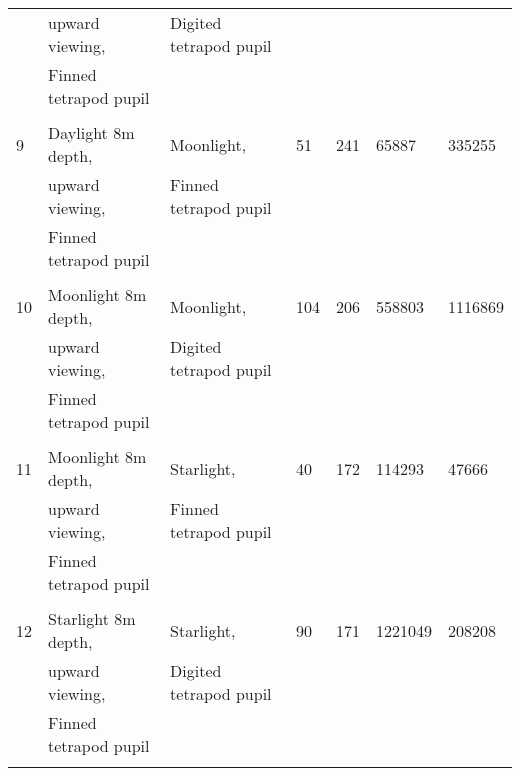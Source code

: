 \begin{tabular}{lllllll}
&upward viewing,&Digited tetrapod pupil&&&&\\\
&Finned tetrapod pupil&&&&&\\\\\hline
9&Daylight 8m depth,&Moonlight,&51&241&65887&335255\\\
&upward viewing,&Finned tetrapod pupil&&&&\\\
&Finned tetrapod pupil&&&&&\\\\\hline
10&Moonlight 8m depth,&Moonlight,&104&206&558803&1116869\\\
&upward viewing,&Digited tetrapod pupil&&&&\\\
&Finned tetrapod pupil&&&&&\\\\\hline
11&Moonlight 8m depth,&Starlight,&40&172&114293&47666\\\
&upward viewing,&Finned tetrapod pupil&&&&\\\
&Finned tetrapod pupil&&&&&\\\\\hline
12&Starlight 8m depth,&Starlight,&90&171&1221049&208208\\\
&upward viewing,&Digited tetrapod pupil&&&&\\\
&Finned tetrapod pupil&&&&&\\\\\hline
\bottomrule
\end{tabular}
